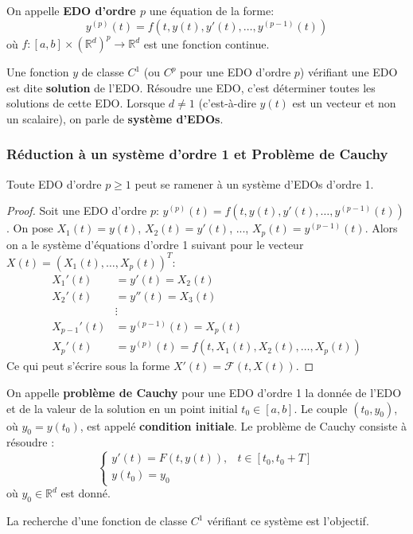 \begin{definition}
On appelle \textbf{EDO d'ordre $p$} une équation de la forme:
\[ y^{(p)}(t) = f(t, y(t), y'(t), \dots, y^{(p-1)}(t)) \]
où $f: [a,b] \times (\mathbb{R}^d)^p \to \mathbb{R}^d$ est une fonction continue.
\end{definition}

\begin{definition}
Une fonction $y$ de classe $C^1$ (ou $C^p$ pour une EDO d'ordre $p$) vérifiant une EDO est dite \textbf{solution} de l'EDO.
Résoudre une EDO, c'est déterminer toutes les solutions de cette EDO.
Lorsque $d \neq 1$ (c'est-à-dire $y(t)$ est un vecteur et non un scalaire), on parle de \textbf{système d'EDOs}.
\end{definition}

\subsubsection{Réduction à un système d'ordre 1 et Problème de Cauchy}
\label{sssec:reduction_ordre1_cauchy}
\begin{theorem}
Toute EDO d'ordre $p \ge 1$ peut se ramener à un système d'EDOs d'ordre 1.
\end{theorem}
\begin{proof}
Soit une EDO d'ordre $p$: $y^{(p)}(t) = f(t, y(t), y'(t), \dots, y^{(p-1)}(t))$.
On pose $X_1(t) = y(t)$, $X_2(t) = y'(t)$, ..., $X_p(t) = y^{(p-1)}(t)$.
Alors on a le système d'équations d'ordre 1 suivant pour le vecteur $X(t) = (X_1(t), \dots, X_p(t))^T$:
\begin{align*}
X_1'(t) &= y'(t) = X_2(t) \\
X_2'(t) &= y''(t) = X_3(t) \\
&\vdots \\
X_{p-1}'(t) &= y^{(p-1)}(t) = X_p(t) \\
X_p'(t) &= y^{(p)}(t) = f(t, X_1(t), X_2(t), \dots, X_p(t))
\end{align*}
Ce qui peut s'écrire sous la forme $X'(t) = \mathcal{F}(t, X(t))$.
\end{proof}

\begin{definition}
On appelle \textbf{problème de Cauchy} pour une EDO d'ordre 1 la donnée de l'EDO et de la valeur de la solution en un point initial $t_0 \in [a,b]$.
Le couple $(t_0, y_0)$, où $y_0 = y(t_0)$, est appelé \textbf{condition initiale}. Le problème de Cauchy consiste à résoudre :
\[
\begin{cases}
y'(t) = F(t, y(t)), & t \in [t_0, t_0+T] \\
y(t_0) = y_0
\end{cases}
\]
où $y_0 \in \mathbb{R}^d$ est donné.
\end{definition}
La recherche d'une fonction de classe $C^1$ vérifiant ce système est l'objectif.


